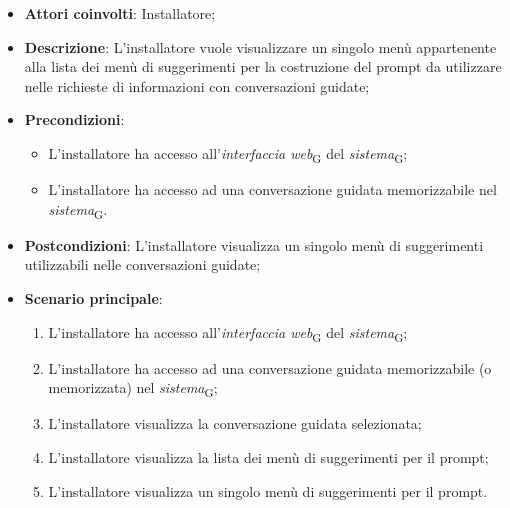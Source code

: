 \begin{itemize}
    \item \textbf{Attori coinvolti}: Installatore;
    \item \textbf{Descrizione}: L'installatore vuole visualizzare un singolo menù appartenente alla lista dei menù di suggerimenti per la costruzione del prompt da utilizzare nelle richieste di informazioni con conversazioni guidate;
    \item \textbf{Precondizioni}: 
    \begin{itemize}
        \item L’installatore ha accesso all’\textit{interfaccia web}\textsubscript{G} del \textit{sistema}\textsubscript{G};
        \item L’installatore ha accesso ad una conversazione guidata memorizzabile nel \textit{sistema}\textsubscript{G}.
    \end{itemize}
    \item \textbf{Postcondizioni}: L'installatore visualizza un singolo menù di suggerimenti utilizzabili nelle conversazioni guidate;
    \item \textbf{Scenario principale}:
    \begin{enumerate}
        \item L’installatore ha accesso all’\textit{interfaccia web}\textsubscript{G} del \textit{sistema}\textsubscript{G};
        \item L’installatore ha accesso ad una conversazione guidata memorizzabile (o memorizzata) nel \textit{sistema}\textsubscript{G};
        \item L'installatore visualizza la conversazione guidata selezionata;
        \item L'installatore visualizza la lista dei menù di suggerimenti per il prompt;
        \item L'installatore visualizza un singolo menù di suggerimenti per il prompt.
    \end{enumerate}
\end{itemize}

